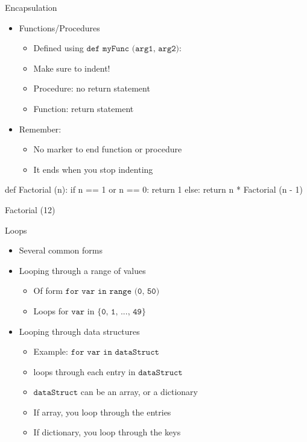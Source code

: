 \documentclass[aspectratio=169]{beamer}
\begin{document}
\begin{frame}[fragile]{Encapsulation}

\begin{itemize}
\item Functions/Procedures
        \begin{itemize}
	\item Defined using $\texttt{def myFunc (arg1, arg2):}$
	\item Make sure to indent!
	\item Procedure: no return statement
	\item Function: return statement
        \end{itemize}
\item Remember:
        \begin{itemize}
        \item No marker to end function or procedure
        \item It ends when you stop indenting
        \end{itemize}
\end{itemize}

\begin{SQL}
def Factorial (n):
     if n == 1 or n == 0:
          return 1
     else:
          return n * Factorial (n - 1)

Factorial (12)
\end{SQL}

\end{frame}

\begin{frame}{Loops}

\begin{itemize}
\item Several common forms
\item Looping through a range of values
        \begin{itemize}
	\item Of form  $\texttt{for var in range (0, 50)}$
	\item Loops for $\texttt{var}$ in $\texttt{\{0, 1, ..., 49\}}$
        \end{itemize}
\item Looping through data structures
        \begin{itemize}
        \item Example: $\texttt{for var in dataStruct}$
	\item loops through each entry in $\texttt{dataStruct}$
	\item $\texttt{dataStruct}$ can be an array, or a dictionary 
	\item If array, you loop through the entries
	\item If dictionary, you loop through the keys
        \end{itemize}
\end{itemize}
\end{frame}
\end{document}
